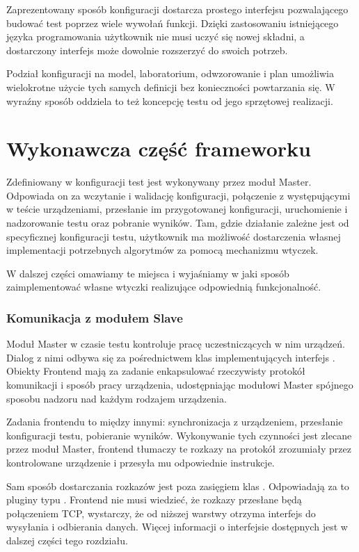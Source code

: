 \documentclass[00-praca-magisterska.tex]{subfiles}
\begin{document}
Zaprezentowany sposób konfiguracji dostarcza prostego interfejsu pozwalającego
budować test poprzez wiele wywołań funkcji. Dzięki zastosowaniu istniejącego
języka programowania użytkownik nie musi uczyć się nowej składni, a dostarczony
interfejs może dowolnie rozszerzyć do swoich potrzeb.

Podział konfiguracji na model, laboratorium, odwzorowanie i plan umożliwia
wielokrotne użycie tych samych definicji bez konieczności powtarzania się. W
wyraźny sposób oddziela to też koncepcję testu od jego sprzętowej realizacji.

\section{Wykonawcza część frameworku}

Zdefiniowany w konfiguracji test jest wykonywany przez moduł Master. Odpowiada
on za wczytanie i walidację konfiguracji, połączenie z występującymi w teście
urządzeniami, przesłanie im przygotowanej konfiguracji, uruchomienie i
nadzorowanie testu oraz pobranie wyników. Tam, gdzie działanie zależne
jest od specyficznej konfiguracji testu, użytkownik ma możliwość dostarczenia
własnej implementacji potrzebnych algorytmów za pomocą mechanizmu wtyczek.

W dalszej części omawiamy te miejsca i wyjaśniamy w jaki sposób zaimplementować
własne wtyczki realizujące odpowiednią funkcjonalność.

\subsubsection{Komunikacja z modułem Slave}

Moduł Master w czasie testu kontroluje pracę uczestniczących w nim urządzeń.
Dialog z nimi odbywa się za pośrednictwem klas implementujących interfejs
. Obiekty Frontend mają za zadanie enkapsulować rzeczywisty
protokół komunikacji i sposób pracy urządzenia, udostępniając modułowi Master
spójnego sposobu nadzoru nad każdym rodzajem urządzenia.

Zadania frontendu to między innymi: synchronizacja z urządzeniem, przesłanie
konfiguracji testu, pobieranie wyników. Wykonywanie tych czynności jest zlecane
przez moduł Master, frontend tłumaczy te rozkazy na protokół zrozumiały przez
kontrolowane urządzenie i przesyła mu odpowiednie instrukcje.

Sam sposób dostarczania rozkazów jest poza zasięgiem klas .
Odpowiadają za to pluginy typu . Frontend nie musi
wiedzieć, że rozkazy przesłane będą połączeniem TCP, wystarczy, że od niższej
warstwy otrzyma interfejs do wysyłania i odbierania danych. Więcej informacji o
interfejsie  dostępnych jest w dalszej części tego
rozdziału.
\end{document}

